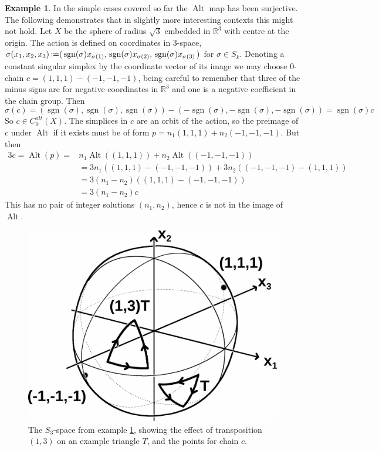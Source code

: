 \documentclass[11pt,a4paper,twoside]{article}
\theoremstyle{plain}
\theoremstyle{definition}
\theoremstyle{definition}
\theoremstyle{definition}
\theoremstyle{definition}
\newtheorem{example}[thm]{Example}
\theoremstyle{definition}
\DeclareMathOperator{\Alt}{Alt}
\DeclareMathOperator{\sgn}{sgn}
\DeclareMathOperator{\coloneqq}{\vcentcolon=}
\begin{document}
\vspace{2mm}
\begin{example}
\label{Ex:AltNotSurjective}
In the simple cases covered so far the $\Alt$ map has been surjective. The following demonstrates that in slightly more interesting contexts this might not hold. Let $X$ be the sphere of radius $\sqrt{3}$ embedded in $\mathbb{R}^3$ with centre at the origin. The action is defined on coordinates in $3$-space, $\sigma(x_1,x_2,x_3)\coloneqq(\,\sgn(\sigma)x_{\sigma(1)},\,\sgn(\sigma)x_{\sigma(2)},\,\sgn(\sigma)x_{\sigma(3)}\,)$ for $\sigma\in S_k$. Denoting a constant singular simplex by the coordinate vector of its image we may choose $0$-chain $c=(1,1,1)-(-1,-1,-1)$, being careful to remember that three of the minus signs are for negative coordinates in $\mathbb{R}^3$ and one is a negative coefficient in the chain group. Then $$\sigma(c)=(\sgn(\sigma),\sgn(\sigma),\sgn(\sigma))-(-\sgn(\sigma),-\sgn(\sigma),-\sgn(\sigma))=\sgn(\sigma)c$$
So $c\in C^{alt}_0(X)$. The simplices in $c$ are an orbit of the action, so the preimage of $c$ under $\Alt$ if it exists must be of form $p=n_1(1,1,1)+n_2(-1,-1,-1)$. But then
\begin{alignat*}{3}
c=\Alt(p)= & n_1\Alt((1,1,1))+n_2\Alt((-1,-1,-1)) \\
    & =3n_1((1,1,1)-(-1,-1,-1))+3n_2((-1,-1,-1)-(1,1,1)) \\
    & =3(n_1-n_2)((1,1,1)-(-1,-1,-1)) \\
    & =3(n_1-n_2)c
\end{alignat*}
This has no pair of integer solutions $(n_1,n_2)$, hence $c$ is not in the image of $\Alt$.
\begin{figure}
    \centering
    \includegraphics[scale=0.15]{Images/AltNotSurjectiveExample.jpg}
    \caption{The $S_3$-space from example \ref{Ex:AltNotSurjective}, showing the effect of transposition $(1,3)$ on an example triangle $T$, and the points for chain $c$.}
    \label{Fig:AltNotSurjective}
    \end{figure}
\end{example}
\end{document}

